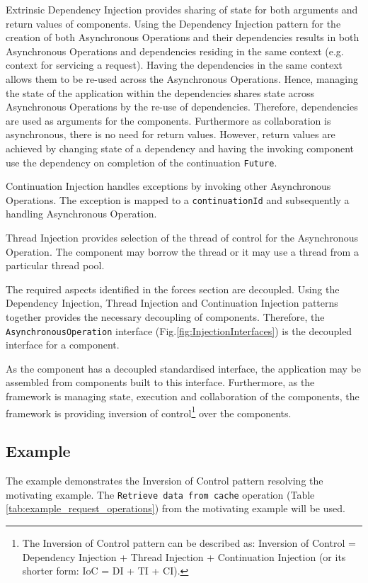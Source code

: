 \documentclass[prodmode]{style/acmlarge}
\begin{document}
Extrinsic Dependency Injection \cite{ioc} provides sharing of state for both
arguments and return values of components.  Using the Dependency Injection
pattern for the creation of both Asynchronous Operations and their dependencies
results in both Asynchronous Operations and dependencies residing in the same
context (e.g. context for servicing a request).  Having the dependencies in the
same context allows them to be re-used across the Asynchronous Operations. 
Hence, managing the state of the application within the dependencies shares
state across Asynchronous Operations by the re-use of dependencies.  Therefore,
dependencies are used as arguments for the components.  Furthermore as
collaboration is asynchronous, there is no need for return values.  However,
return values are achieved by changing state of a dependency and having the
invoking component use the dependency on completion of the continuation
\texttt{Future}.

Continuation Injection handles exceptions by invoking other Asynchronous
Operations. The exception is mapped to a \texttt{continuationId} and
subsequently a handling Asynchronous Operation.

Thread Injection provides selection of the thread of control for the
Asynchronous Operation.  The component may borrow the thread or it may use a
thread from a particular thread pool.

The required aspects identified in the forces section are decoupled.  Using
the Dependency Injection, Thread Injection and Continuation Injection patterns
together provides the necessary decoupling of components.  Therefore, the
\texttt{AsynchronousOperation} interface (Fig.\ref{fig:InjectionInterfaces})
is the decoupled interface for a component.

As the component has a decoupled standardised interface, the application may be
assembled from components built to this interface.  Furthermore, as the
framework is managing state, execution and collaboration of the components, the
framework is providing inversion of control\footnote{The Inversion of Control
pattern can be described as: Inversion of Control = Dependency Injection +
Thread Injection + Continuation Injection (or its shorter form: IoC = DI + TI +
CI).} over the components.


\subsection{Example}

The example demonstrates the Inversion of Control pattern resolving the
motivating example.  The \texttt{Retrieve data from cache} operation (Table
\ref{tab:example_request_operations}) from the motivating example will be used.  
\end{document}
